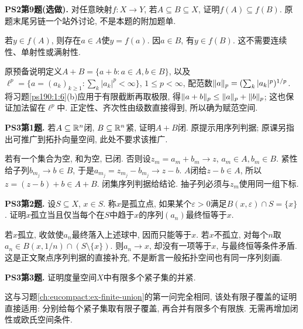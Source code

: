 \begin{exercise}\label{ps190:2:9}
\textbf{PS2第9题(选做).} 对任意映射$f:X\to Y$, 若$A\subseteq B\subseteq X$, 证明$f(A)\subseteq f(B)$. 原题末尾另链一个站外讨论, 不是本题的附加题单.
\end{exercise}
\begin{solution}
若$y\in f(A)$, 则存在$a\in A$使$y=f(a)$. 因$a\in B$, 有$y\in f(B)$. 这不需要连续性、单射性或满射性.
\end{solution}

原预备说明定义$A+B=\{a+b:a\in A,b\in B\}$, 以及$\ell^p=\{a=(a_k)_{k\ge1}:\sum_k|a_k|^p<\infty\}$, $1\le p<\infty$, 配范数$\lVert a\rVert_p=(\sum_k|a_k|^p)^{1/p}$. 将习题\ref{ps190:1:6}(b)应用于有限截断再取极限, 得$\lVert a+b\rVert_p\le\lVert a\rVert_p+\lVert b\rVert_p$; 这也保证加法留在$\ell^p$中. 正定性、齐次性由级数直接得到, 所以确为赋范空间.

\begin{exercise}\label{ps190:3:1}
\textbf{PS3第1题.} 若$A\subseteq\mathbb R^n$闭, $B\subseteq\mathbb R^n$紧, 证明$A+B$闭. 原提示用序列判据; 原课另指出可推广到拓扑向量空间, 此处不要求该推广.
\end{exercise}
\begin{solution}
若有一个集合为空, 和为空, 已闭. 否则设$z_m=a_m+b_m\to z$, $a_m\in A,b_m\in B$. 紧性给子列$b_{m_j}\to b\in B$, 于是$a_{m_j}=z_{m_j}-b_{m_j}\to z-b$. $A$闭给$z-b\in A$, 所以$z=(z-b)+b\in A+B$. 闭集序列判据给结论. 抽子列必须与$z_m$使用同一组下标.
\end{solution}

\begin{exercise}\label{ps190:3:2}
\textbf{PS3第2题.} 设$S\subseteq X$, $x\in S$. 称$x$是孤立点, 如果某个$\varepsilon>0$满足$B(x,\varepsilon)\cap S=\{x\}$. 证明$x$孤立当且仅当每个在$S$中趋于$x$的序列$(a_n)$最终恒等于$x$.
\end{exercise}
\begin{solution}
若$x$孤立, 收敛使$a_n$最终落入上述球中, 因而只能等于$x$. 若$x$不孤立, 对每个$n$取$a_n\in B(x,1/n)\cap(S\setminus\{x\})$. 则$a_n\to x$, 却没有一项等于$x$, 与最终恒等条件矛盾. 这是正文聚点序列判据的直接补充, 不是断言一般拓扑空间也有同一序列刻画.
\end{solution}

\begin{exercise}\label{ps190:3:3}
\textbf{PS3第3题.} 证明度量空间$X$中有限多个紧子集的并紧.
\end{exercise}
\begin{solution}
这与习题\ref{ch:eucompact:ex-finite-union}的第一问完全相同, 该处有限子覆盖的证明直接适用: 分别给每个紧子集取有限子覆盖, 再合并有限多个有限族. 无需再增加闭性或欧氏空间条件.
\end{solution}

